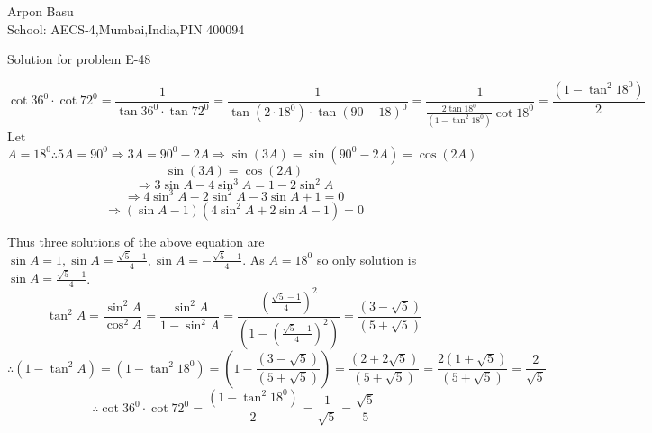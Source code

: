 \documentclass[a4paper,10pt]{article}
\begin{document}
\begin{center}


Arpon Basu \\
School: AECS-4,Mumbai,India,PIN 400094

Solution for problem E-48
\end{center}
 $$\cot36^0 \cdot \cot72^0 = \frac{1}{\tan36^0 \cdot \tan72^0} =\frac{1}{\tan (2\cdot18^0) \cdot \tan(90-18)^0} =\frac{1}{ \frac{2\tan18^0}{(1-\tan^2 18^0)}\cot18^0} =\frac{(1-\tan^2 18^0)}{2} $$
Let $A=18^0 \therefore 5A=90^0 \Rightarrow 3A=90^0 - 2A \Rightarrow \sin(3A)=\sin(90^0 - 2A)=\cos(2A)$
$$ \sin(3A)=\cos(2A) $$
$$\Rightarrow  3\sin A - 4\sin^3 A = 1- 2\sin^2 A$$
$$\Rightarrow   4\sin^3 A- 2\sin^2 A - 3\sin A +1=0$$
$$\Rightarrow   (\sin A -1)(4\sin^2 A + 2\sin A -1)=0$$

Thus three solutions of the above equation are ${\sin A=1 , \sin A=\frac{\sqrt{5}-1}{4},\sin A= -\frac{\sqrt{5}-1}{4}}$. As $A=18^0$ so only solution is 
$\sin A=\frac{\sqrt{5}-1}{4}$.
$$ \tan^2 A = \frac{\sin^2 A}{\cos^2 A}= \frac{\sin^2 A}{1- \sin^2 A}= \frac{(\frac{\sqrt{5}-1}{4})^2}{(1-(\frac{\sqrt{5}-1}{4})^2)}= \frac{(3-\sqrt{5})}{(5+\sqrt{5})}$$
$$ \therefore (1-\tan^2 A) =(1-\tan^2 18^0)=(1-\frac{(3-\sqrt{5})}{(5+\sqrt{5})})=\frac{(2+2\sqrt{5})}{(5+\sqrt{5})}=\frac{2(1+\sqrt{5})}{{(5+\sqrt{5})}}=\frac{2}{\sqrt{5}}$$
$$ \therefore \cot36^0 \cdot \cot72^0 = \frac{(1-\tan^2 18^0)}{2}=\frac{1}{\sqrt{5}}=\frac{\sqrt{5}}{5} $$
\end{document}

